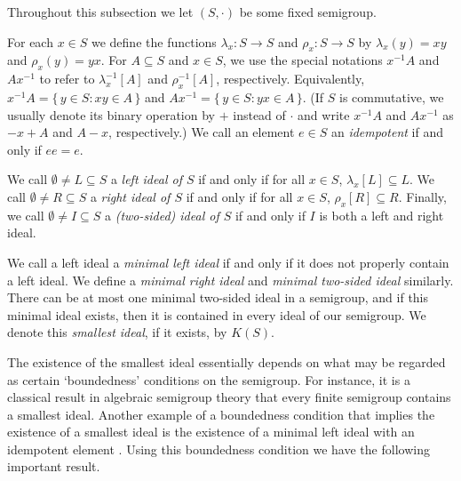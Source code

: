 \documentclass[12pt,showtrims]{memoir}
\theoremstyle{plain}
\theoremstyle{definition}
\begin{document}
Throughout this subsection we let $(S, \cdot)$ be some fixed semigroup. 

For each $x \in S$ we define the functions $\lambda_x \colon S \to S$ and $\rho_x \colon S \to S$ by $\lambda_x(y) = xy$ and $\rho_x(y) = yx$. 
For $A \subseteq S$ and $x \in S$, we use the special notations $x^{-1}A$ and $Ax^{-1}$ to refer to $\lambda_x^{-1}[A]$ and $\rho_x^{-1}[A]$, respectively. 
Equivalently, $x^{-1}A = \{\, y \in S : xy \in A \,\}$ and $Ax^{-1} = \{\, y \in S : yx \in A \,\}$.
(If $S$ is commutative, we usually denote its binary operation by $+$ instead of $\cdot$ and write $x^{-1}A$ and $Ax^{-1}$ as $-x+A$ and $A-x$, respectively.)
We call an element $e \in S$ an \textsl{idempotent} if and only if $ee = e$.

We call $\emptyset \ne L \subseteq S$ a \textsl{left ideal of $S$} if and only if for all $x \in S$, $\lambda_x[L] \subseteq L$. 
We call $\emptyset \ne R \subseteq S$ a \textsl{right ideal of $S$} if and only if for all $x \in S$, $\rho_x[R] \subseteq R$. 
Finally, we call $\emptyset \ne I \subseteq S$ a \textsl{(two-sided) ideal of $S$} if and only if $I$ is both a left and right ideal.

We call a left ideal a \textsl{minimal left ideal} if and only if it does not properly contain a left ideal.
We define a \textsl{minimal right ideal} and \textsl{minimal two-sided ideal} similarly.
There can be at most one minimal two-sided ideal in a semigroup, and if this minimal ideal exists, then it is contained in every ideal of our semigroup.
We denote this \textsl{smallest ideal}, if it exists, by $K(S)$.%

The existence of the smallest ideal essentially depends on what may be regarded as certain `boundedness' conditions on the semigroup.
For instance, it is a classical result in algebraic semigroup theory that every finite semigroup contains a smallest ideal.
Another example of a boundedness condition that implies the existence of a smallest ideal is the existence of a minimal left ideal with an idempotent element \cite[Theorem 1.59]{Hindman:1998fk}. 
Using this boundedness condition we have the following important result.
\end{document}
